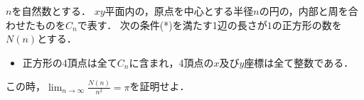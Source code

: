 $n$を自然数とする．
$xy$平面内の，原点を中心とする半径$n$の円の，内部と周を合わせたものを$C_n$で表す．
次の条件(*)を満たす1辺の長さが$1$の正方形の数を$N(n)$とする．
\begin{itemize}
  \item[(*)] 正方形の4頂点は全て$C_n$に含まれ，4頂点の$x$及び$y$座標は全て整数である．
\end{itemize}
この時，${\displaystyle \lim_{n\to\infty}\frac{N(n)}{n^2}=\pi}$を証明せよ．
